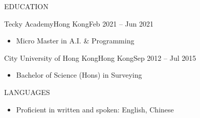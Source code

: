 \documentclass[]{resume}
\begin{document}
	\begin{cvsection}{EDUCATION}
		\begin{cvsubsection}{Tecky Academy}{Hong Kong}{Feb 2021 -- Jun 2021}
			\begin{itemize}
				\item Micro Master in A.I. \& Programming
			\end{itemize}
		\end{cvsubsection}
		
		\begin{cvsubsection}{City University of Hong Kong}{Hong Kong}{Sep 2012 -- Jul 2015}
			\begin{itemize}
				\item Bachelor of Science (Hons) in Surveying
			\end{itemize}
		\end{cvsubsection}
	\end{cvsection}
	
	\begin{cvsection}{LANGUAGES}
		\begin{cvsubsection}{}{}{}	
			\begin{itemize}
				\item Proficient in written and spoken: English, Chinese 
			\end{itemize}
		\end{cvsubsection}
	\end{cvsection}
	
\end{document}
